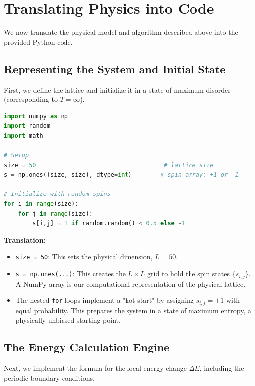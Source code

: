 \documentclass[10pt, letterpaper]{article}
\begin{document}
\section{Translating Physics into Code}

We now translate the physical model and algorithm described above into the provided Python code.

\subsection{Representing the System and Initial State}
First, we define the lattice and initialize it in a state of maximum disorder (corresponding to $T=\infty$).

\begin{lstlisting}[language=Python, caption={System setup and random initialization.}]
import numpy as np
import random
import math

# Setup
size = 50                                    # lattice size
s = np.ones((size, size), dtype=int)        # spin array: +1 or -1

# Initialize with random spins
for i in range(size):
    for j in range(size):
        s[i,j] = 1 if random.random() < 0.5 else -1
\end{lstlisting}
\textbf{Translation:}
\begin{itemize}
    \item \texttt{size = 50}: This sets the physical dimension, $L=50$.
    \item \texttt{s = np.ones(...)}: This creates the $L \times L$ grid to hold the spin states $\{s_{i,j}\}$. A NumPy array is our computational representation of the physical lattice.
    \item The nested \texttt{for} loops implement a "hot start" by assigning $s_{i,j} = \pm 1$ with equal probability. This prepares the system in a state of maximum entropy, a physically unbiased starting point.
\end{itemize}

\subsection{The Energy Calculation Engine}
Next, we implement the formula for the local energy change $\Delta E$, including the periodic boundary conditions.
\end{document}
